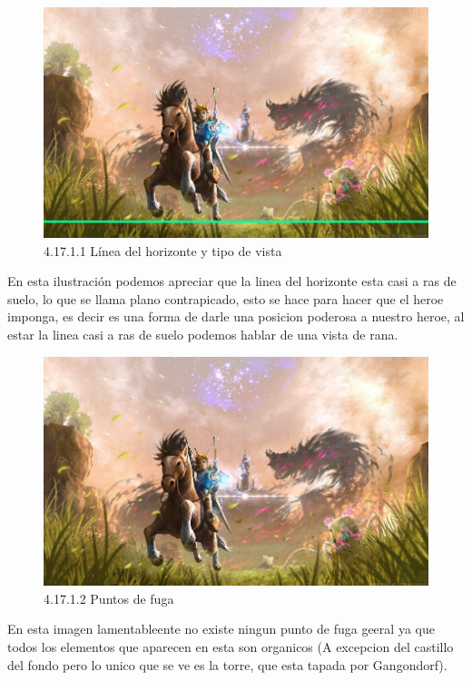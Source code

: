 \documentclass[12pt]{article}
\begin{document}
      \begin{figure}[H]
        \centering
        \includegraphics[width=\textwidth]{images/Saúl/Sección 17/EA_img17_1Perspectiva_1LineaTierra-TipoVista.png}
        \caption{\small 4.17.1.1 Línea del horizonte y tipo de vista}
      \end{figure}
      En esta ilustración podemos apreciar que la linea del horizonte esta casi a ras de suelo, lo que se llama plano contrapicado, esto se hace para hacer que el heroe imponga, es decir es una forma de darle una posicion poderosa a nuestro heroe, al estar la linea casi a ras de suelo podemos hablar de una vista de rana.


      \begin{figure}[H]
        \centering
        \includegraphics[width=\textwidth]{images/Saúl/Sección 17/EA_img17_1Perspectiva_2PuntosFuga.png}
        \caption{\small 4.17.1.2 Puntos de fuga}
      \end{figure}
      En esta imagen lamentableente no existe ningun punto de fuga geeral ya que todos los elementos que aparecen en esta son organicos (A excepcion del castillo del fondo pero lo unico que se ve es la torre, que esta tapada por Gangondorf).
\end{document}
